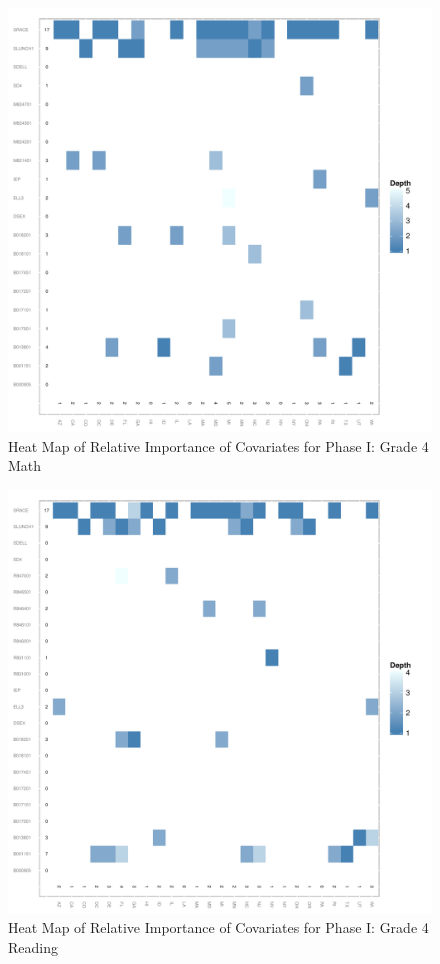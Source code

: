 \documentclass[letterpaper,12p,twoside]{article} %
\begin{document}
\begin{figure}[h]
\begin{center}
\includegraphics[width=\textwidth]{../Figures2009/g4math-mlpsa-ctree-heat.pdf}
\caption{Heat Map of Relative Importance of Covariates for Phase I: Grade 4 Math}
\label{fig:g4math-mlpsa-ctree-heat}
\end{center}
\end{figure}

\begin{figure}[h]
\begin{center}
\includegraphics[width=\textwidth]{../Figures2009/g4read-mlpsa-ctree-heat.pdf}
\caption{Heat Map of Relative Importance of Covariates for Phase I: Grade 4 Reading}
\label{fig:g4read-mlpsa-ctree-heat}
\end{center}
\end{figure}
\end{document}
